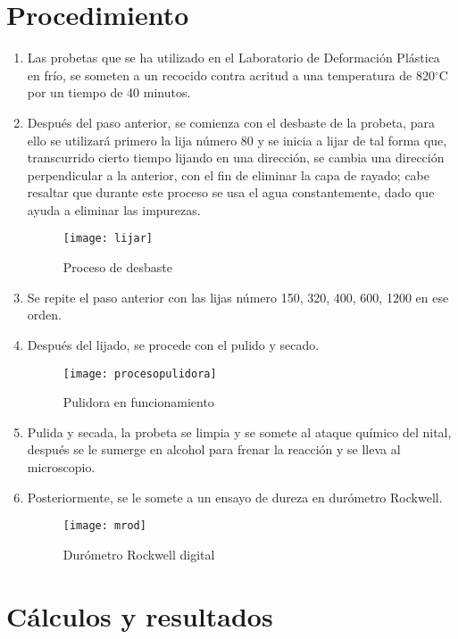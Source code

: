 \documentclass[a4paper,12pt]{report}
\begin{document}
\chapter{Procedimiento}
\begin{enumerate}
\item Las probetas que se ha utilizado en el Laboratorio de Deformación Plástica en frío, se someten a un recocido contra acritud a una temperatura de 820$^{\circ}$C por un tiempo de 40 minutos.
\item Después del paso anterior, se comienza con el desbaste de la probeta, para ello se utilizará primero la lija número 80 y se inicia a lijar de tal forma que, transcurrido cierto tiempo lijando en una dirección, se cambia una dirección perpendicular a la anterior, con el fin de eliminar la capa de rayado; cabe resaltar que durante este proceso se usa el agua constantemente, dado que ayuda a eliminar las impurezas.
\begin{figure}[H]
\begin{center}
\texttt{[image: lijar]}
\end{center}
\caption{Proceso de desbaste}
\end{figure}
\item Se repite el paso anterior con las lijas número 150, 320, 400, 600, 1200 en ese orden.
\newpage
\item Después del lijado, se procede con el pulido y secado.
\begin{figure}[H]
\begin{center}
\texttt{[image: procesopulidora]}
\end{center}
\caption{Pulidora en funcionamiento}
\end{figure}
\item Pulida y secada, la probeta se limpia y se somete al ataque químico del nital, después se le sumerge en alcohol para frenar la reacción y se lleva al microscopio.
\item Posteriormente, se le somete a un ensayo de dureza en durómetro Rockwell.
\begin{figure}[H]
\begin{center}
\texttt{[image: mrod]}
\end{center}
\caption{Durómetro Rockwell digital}
\end{figure}
\end{enumerate}
\chapter{Cálculos y resultados}
\end{document}
